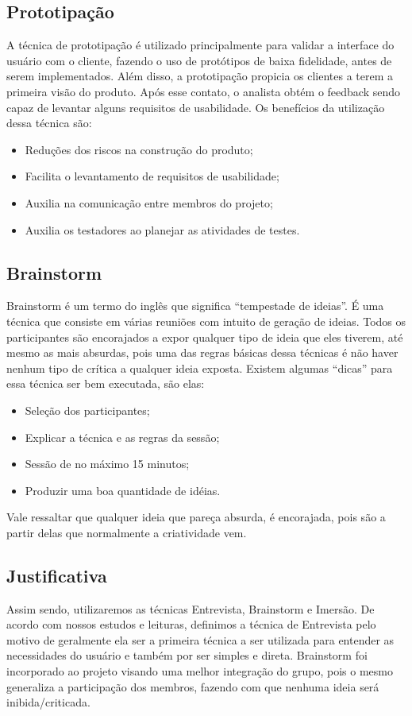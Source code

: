 \subsection{Prototipação}
A técnica de prototipação é utilizado principalmente para validar a interface do usuário com o cliente, fazendo o uso de protótipos de baixa fidelidade, antes de serem implementados. Além disso, a prototipação propicia os clientes a terem a primeira visão do produto. Após esse contato, o analista obtém o feedback sendo capaz de levantar alguns requisitos de usabilidade. Os benefícios da utilização dessa técnica são:
\begin{itemize}
\item{Reduções dos riscos na construção do produto;}
\item{Facilita o levantamento de requisitos de usabilidade;}
\item{Auxilia na comunicação entre membros do projeto;}
\item{Auxilia os testadores ao planejar as atividades de testes.}
\end{itemize}

\subsection{Brainstorm}
Brainstorm é um termo do inglês que significa “tempestade de ideias”. É uma técnica que consiste em várias reuniões com intuito de geração de ideias. Todos os participantes são encorajados a expor qualquer tipo de ideia que eles tiverem, até mesmo as mais absurdas, pois uma das regras básicas dessa técnicas é não haver nenhum tipo de crítica a qualquer ideia exposta. Existem algumas “dicas” para essa técnica ser bem executada, são elas:
\begin{itemize}
\item{Seleção dos participantes;}
\item{Explicar a técnica e as regras da sessão;}
\item{Sessão de no máximo 15 minutos;}
\item{Produzir uma boa quantidade de idéias.}
\end{itemize}
Vale ressaltar que qualquer ideia que pareça absurda, é encorajada, pois são a partir delas que normalmente a criatividade vem.
\subsection{Justificativa}
Assim sendo, utilizaremos as técnicas Entrevista, Brainstorm e Imersão. De acordo com nossos estudos e leituras, definimos a técnica de Entrevista pelo motivo de geralmente ela ser a primeira técnica a ser utilizada para entender as necessidades do usuário e também por ser simples e direta. Brainstorm foi incorporado ao projeto visando uma melhor integração do grupo, pois o mesmo generaliza a participação dos membros, fazendo com que nenhuma ideia será inibida/criticada.